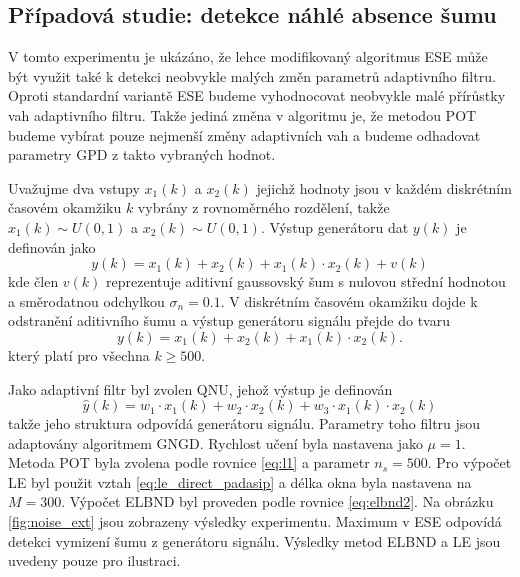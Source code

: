 \subsection{Případová studie: detekce náhlé absence šumu}
V tomto experimentu je ukázáno, že lehce modifikovaný algoritmus ESE může být využit také k detekci neobvykle malých změn parametrů adaptivního filtru. Oproti standardní variantě ESE budeme vyhodnocovat neobvykle malé přírůstky vah adaptivního filtru. Takže jediná změna v algoritmu je, že metodou POT budeme vybírat pouze nejmenší změny adaptivních vah a budeme odhadovat parametry GPD z takto vybraných hodnot.
\par
Uvažujme dva vstupy $x_1(k)$ a $x_2(k)$ jejichž hodnoty jsou v každém diskrétním časovém okamžiku $k$ vybrány z rovnoměrného rozdělení, takže  $x_1(k) \sim U(0,1)$ a $x_2(k)\sim U(0,1)$. Výstup generátoru dat $y(k)$ je definován jako
\begin{equation}
    y(k)=x_1(k)+x_2(k)+x_1(k)\cdot x_2(k)+v(k)
\end{equation}
kde člen $v(k)$ reprezentuje aditivní gaussovský šum s nulovou střední hodnotou a směrodatnou odchylkou $\sigma_n=0.1$. V diskrétním časovém okamžiku dojde k odstranění aditivního šumu a výstup generátoru signálu přejde do tvaru
\begin{equation}
    y(k)=x_1(k)+x_2(k)+x_1(k)\cdot x_2(k).
\end{equation}
který platí pro všechna $k\geq 500$.
\par 
Jako adaptivní filtr byl zvolen QNU, jehož výstup je definován
\begin{equation}
\hat{y}(k)=w_1\cdot x_1(k)+w_2\cdot x_2(k)+w_3\cdot x_1(k)\cdot x_2(k)
\end{equation}
takže jeho struktura odpovídá generátoru signálu. Parametry toho filtru jsou adaptovány algoritmem GNGD. Rychlost učení byla nastavena jako $\mu=1$. Metoda POT byla zvolena podle rovnice \ref{eq:l1} a parametr $n_s=500$.  Pro výpočet LE byl použit vztah \ref{eq:le_direct_padasip} a délka okna byla nastavena na $M=300$. Výpočet ELBND byl proveden podle rovnice \ref{eq:elbnd2}. Na obrázku \ref{fig:noise_ext} jsou zobrazeny výsledky experimentu. Maximum v ESE odpovídá detekci vymizení šumu z generátoru signálu. Výsledky metod ELBND a LE jsou uvedeny pouze pro ilustraci. 

